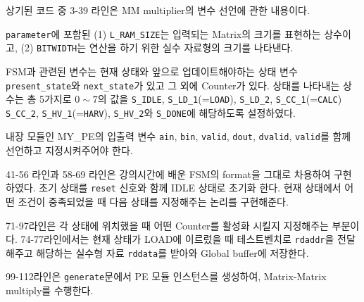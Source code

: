 \documentclass{article}
\begin{document}
\begin{itemize*}
\item 상기된 코드 중 3-39 라인은 MM multiplier의 변수 선언에 관한 내용이다.
\begin{itemize*}
\item \texttt{parameter}에 포함된 (1) \texttt{L\_RAM\_SIZE}는 입력되는 Matrix의 크기를 표현하는 상수이고, (2) \texttt{BITWIDTH}는 연산을 하기 위한 실수 자료형의 크기를 나타낸다.
\item FSM과 관련된 변수는 현재 상태와 앞으로 업데이트해야하는 상태 변수 \texttt{present\_state}와 \texttt{next\_state}가 있고 그 외에 Counter가 있다. 상태를 나타내는 상수는 총 5가지로 $0 \sim 7$의 값을 \texttt{S\_IDLE}, \texttt{S\_LD\_1}(=\texttt{LOAD}), \texttt{S\_LD\_2}, \texttt{S\_CC\_1}(=\texttt{CALC}) \texttt{S\_CC\_2}, \texttt{S\_HV\_1}(=\texttt{HARV}),  \texttt{S\_HV\_2}와 \texttt{S\_DONE}에 해당하도록 설정하였다.
\item 내장 모듈인 MY\_PE의 입출력 변수 \texttt{ain}, \texttt{bin}, \texttt{valid}, \texttt{dout}, \texttt{dvalid}, \texttt{valid}를 함께 선언하고 지정시켜주어야 한다.
\end{itemize*}

\item 41-56 라인과 58-69 라인은 강의시간에 배운 FSM의 format을
그대로 차용하여 구현하였다. 초기 상태를 \texttt{reset} 신호와 함께 IDLE 상태로 초기화 한다. 현재 상태에서 어떤 조건이 중족되었을 때 다음 상태를 지정해주는 논리를 구현해준다.

\item 71-97라인은 각 상태에 위치했을 때 어떤 Counter를 활성화 시킬지 지정해주는 부분이다. 74-77라인에서는 현재 상태가 LOAD에 이르렀을 때 테스트벤치로 \texttt{rdaddr}을 전달해주고 해당하는 실수형 자료 \texttt{rddata}를 받아와 Global buffer에 저장한다.

\item 99-112라인은 \texttt{generate}문에서 PE 모듈 인스턴스를 생성하여, Matrix-Matrix multiply를 수행한다.
\end{itemize*}
\end{document}
